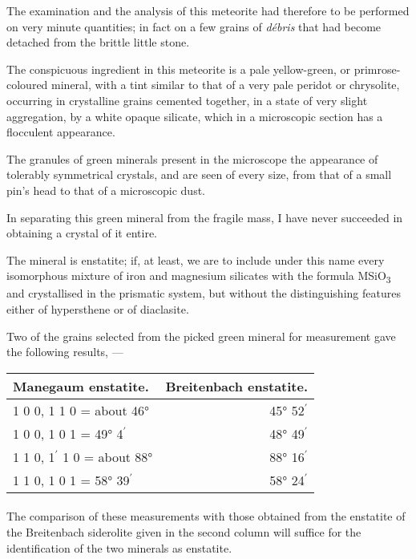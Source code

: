 \documentclass[a4paper, 12pt, oneside]{article}
\begin{document}
The examination and the analysis of this meteorite had therefore to be performed on very minute quantities; in fact on a few grains of \emph{débris} that had become detached from the brittle little stone.

The conspicuous ingredient in this meteorite is a pale yellow-green, or primrose-coloured mineral, with a tint similar to that of a very pale peridot or chrysolite, occurring in crystalline grains cemented together, in a state of very slight aggregation, by a white opaque silicate, which in a microscopic section has a flocculent appearance.

The granules of green minerals present in the microscope the appearance of tolerably symmetrical crystals, and are seen of every size, from that of a small pin's head to that of a microscopic dust.

In separating this green mineral from the fragile mass, I have never succeeded in obtaining a crystal of it entire.

The mineral is enstatite; if, at least, we are to include under this name every isomorphous mixture of iron and magnesium silicates with the formula MSiO\textsubscript{3} and crystallised in the prismatic system, but without the distinguishing features either of hypersthene or of diaclasite.

Two of the grains selected from the picked green mineral for measurement gave the following results, ---
\begin{table}[H]
    \centering
    \footnotesize
    \begin{tabular}{l r}
        Manegaum enstatite. & Breitenbach enstatite. \\ \hline
        1 0 0, 1 1 0 = about 46° & 45° 52$^{\prime}$ \\
        1 0 0, 1 0 1 = 49° 4$^{\prime}$ & 48° 49$^{\prime}$ \\
        1 1 0, 1$^{\prime}$ 1 0 = about 88° & 88° 16$^{\prime}$ \\
        1 1 0, 1 0 1 = 58° 39$^{\prime}$ & 58° 24$^{\prime}$ \\
    \end{tabular}
\end{table}
\paragraph{}
The comparison of these measurements with those obtained from the enstatite of the Breitenbach siderolite given in the second column will suffice for the identification of the two minerals as enstatite.
\end{document}
